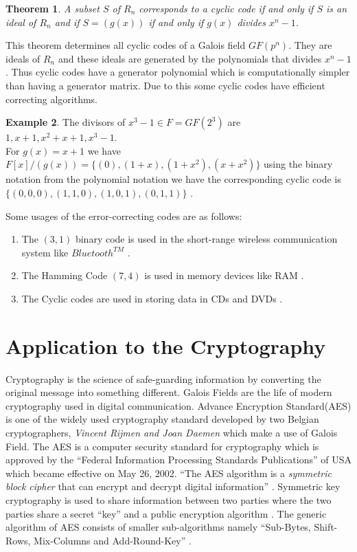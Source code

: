 \documentclass[a4paper,twoside,10pt]{article}
\theoremstyle{plain}
\newtheorem{theorem}{Theorem}[section]
\theoremstyle{definition}
\newtheorem{example}[theorem]{Example}
\begin{document}
\begin{theorem} \cite{error_correct}
A subset \(S\) of \(R_n\) corresponds to a cyclic code if and only if \(S\) is an ideal of \(R_n\) and if \(S=(g(x))\) if and only if  \(g(x)\) divides \(x^n-1\).
\end{theorem}

\noindent
This theorem determines all cyclic codes of a Galois field \(GF(p^n)\). They are ideals of \(R_n\) and these ideals are generated by the polynomials that divides \(x^n-1\). Thus cyclic codes have a generator polynomial which is computationally simpler than having a generator matrix. Due to this some cyclic codes have efficient correcting algorithms.

\begin{example}
  The divisors of \(x^3-1 \in F=GF(2^{3})\) are \(1, x+1, x^2+x+1, x^3-1\).\\
  For \(g(x)=x+1\) we have \(F[x]/(g(x))=\{(0),(1+x),(1+x^2),(x+x^2)\}\) using the binary notation from the polynomial notation we have the corresponding cyclic code is \(\{(0,0,0),(1,1,0),(1,0,1),(0,1,1)\}\) \cite{error_correct}.
\end{example}
Some usages of the error-correcting codes are as follows:
\begin{enumerate}
\item The \((3,1)\) binary code is used in the short-range wireless communication system like \(Bluetooth^{TM}\) \cite{wireless}.
\item The Hamming Code \((7,4)\) is used in memory devices like RAM \cite{coding}.

\item The Cyclic codes are used in storing data in CDs and DVDs \cite{coding}.
\end{enumerate}


\section{Application to the Cryptography}
\noindent
Cryptography is the science of safe-guarding information by converting the original message into something different. Galois Fields are the life of modern cryptography used in digital communication. Advance Encryption Standard(AES) is one of the widely used cryptography standard developed by two Belgian cryptographers,  \textit{Vincent Rijmen and Joan Daemen} \cite{aes} which make a use of Galois Field. The AES is a computer security standard for cryptography which is approved by the ``Federal Information Processing Standards Publications'' of USA which became effective on May 26, 2002. ``The AES algorithm is a \textit{symmetric block cipher} that can encrypt and decrypt digital information'' \cite{aes}. Symmetric key cryptography is used to share information between two parties where the two parties share a secret ``key'' and a public encryption algorithm \cite{wireless}. The generic algorithm of AES consists of smaller sub-algorithms namely ``Sub-Bytes, Shift-Rows, Mix-Columns and Add-Round-Key'' \cite{aes}.\\[2mm]
\end{document}
